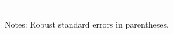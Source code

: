 \begin{table}[H]
{\begin{threeparttable}
\begin{tabular}{lcccccccc}
\bottomrule[0.5pt]                                                                               \label{tab:table2}                                                                       \end{tabular}                                                                                                    \vspace{-13pt}                                                                                           \begin{tablenotes}[flushleft]{\setlength{\itemindent}{-3pt}}          \small                                                                                                           \item Notes: Robust standard errors in   parentheses.            \end{tablenotes}                                                                                         \end{threeparttable}                                                                             }                                                                                                                        \end{table}
